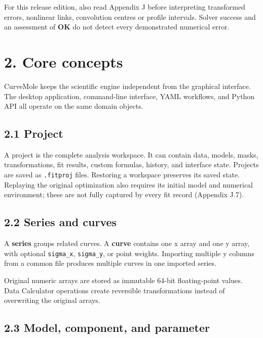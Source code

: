 \documentclass[
  10pt,
  a4paper,
  oneside]{scrreprt}
\begin{document}
For this release edition, also read Appendix J before interpreting
transformed errors, nonlinear links, convolution centres or profile
intervals. Solver success and an assessment of \textbf{OK} do not detect
every demonstrated numerical error.

\hypertarget{core-concepts}{%
\chapter{2. Core concepts}\label{core-concepts}}

CurveMole keeps the scientific engine independent from the graphical
interface. The desktop application, command-line interface, YAML
workflows, and Python API all operate on the same domain objects.

\hypertarget{project}{%
\section{2.1 Project}\label{project}}

A project is the complete analysis workspace. It can contain data,
models, masks, transformations, fit results, custom formulas, history,
and interface state. Projects are saved as \texttt{.fitproj} files.
Restoring a workspace preserves its saved state. Replaying the original
optimization also requires its initial model and numerical environment;
these are not fully captured by every fit record (Appendix J.7).

\hypertarget{series-and-curves}{%
\section{2.2 Series and curves}\label{series-and-curves}}

A \textbf{series} groups related curves. A \textbf{curve} contains one x
array and one y array, with optional \texttt{sigma\_x},
\texttt{sigma\_y}, or point weights. Importing multiple y columns from a
common file produces multiple curves in one imported series.

Original numeric arrays are stored as immutable 64-bit floating-point
values. Data Calculator operations create reversible transformations
instead of overwriting the original arrays.

\hypertarget{model-component-and-parameter}{%
\section{2.3 Model, component, and
parameter}\label{model-component-and-parameter}}
\end{document}
